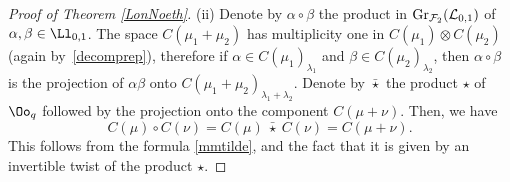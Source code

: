 \begin{proof}[Proof of Theorem \ref{LonNoeth}]
(ii) Denote by $\alpha \circ \beta$ the product in $ {\rm Gr}_{{\mathcal F}_2}({\mathcal L}_{0,1})$ of $\alpha,\beta\in \Ll_{0,1}$. The space $C(\mu_1+\mu_2)$ has multiplicity one in $C(\mu_1)\otimes C(\mu_2)$ (again by~\eqref{decomprep}), therefore if $\alpha \in C(\mu_1)_{\lambda_1}$ and $\beta \in C(\mu_2)_{\lambda_2}$, then $\alpha \circ \beta$ is the projection of $\alpha \beta$ onto $C(\mu_1+\mu_2)_{\lambda_1+\lambda_2}$.
 Denote by $\bar{\star}$ the product $\star$ of $\Oo_q$ followed by the projection onto the component $C(\mu + \nu)$. Then, we have
\begin{equation}\label{filtration=}
C(\mu) \circ C(\nu) = C(\mu)\ \bar{\star} \ C(\nu) = C(\mu + \nu).
\end{equation}
This follows from the formula \eqref{mmtilde}, and the fact that it is given by an invertible twist of the product $\star$.


\end{proof}
